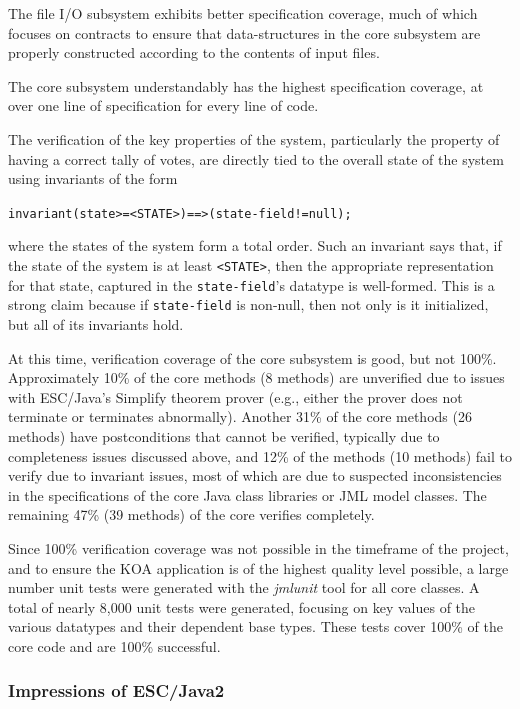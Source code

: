 \documentclass{llncs}
\begin{document}
The file I/O subsystem exhibits better specification coverage, much of
which focuses on contracts to ensure that data-structures in the core
subsystem are properly constructed according to the contents of input
files.

The core subsystem understandably has the highest specification
coverage, at over one line of specification for every line of code.

The verification of the key properties of the system, particularly the
property of having a correct tally of votes, are directly tied to the
overall state of the system using invariants of the form
\begin{alltt}
     invariant (state >= <STATE>) ==> (state-field != null);
\end{alltt}
where the states of the system form a total order.  Such an invariant
says that, if the state of the system is at least \texttt{<STATE>},
then the appropriate representation for that state, captured in the
\texttt{state-field}'s datatype is well-formed.  This is a strong
claim because if \texttt{state-field} is non-null, then not only is it
initialized, but all of its invariants hold.

At this time, verification coverage of the core subsystem is good, but
not 100\%.  Approximately 10\% of the core methods (8 methods) are
unverified due to issues with ESC/Java's Simplify theorem prover
(e.g., either the prover does not terminate or terminates abnormally).
Another 31\% of the core methods (26 methods) have postconditions that
cannot be verified, typically due to completeness issues discussed
above, and 12\% of the methods (10 methods) fail to verify due to
invariant issues, most of which are due to suspected inconsistencies
in the specifications of the core Java class libraries or JML model
classes.  The remaining 47\% (39 methods) of the core verifies
completely.

Since 100\% verification coverage was not possible in the timeframe of
the project, and to ensure the KOA application is of the highest
quality level possible, a large number unit tests were generated with
the \emph{jmlunit} tool for all core classes.  A total of nearly 8,000
unit tests were generated, focusing on key values of the various
datatypes and their dependent base types.  These tests cover 100\% of
the core code and are 100\% successful.

\subsubsection{Impressions of ESC/Java2}
\end{document}
